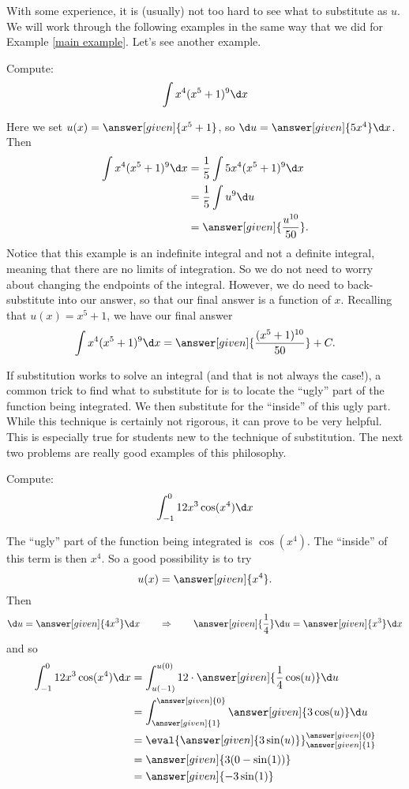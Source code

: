\documentclass{ximera}
\begin{document}
With some experience, it is (usually) not too hard to see what to
substitute as $u$.  We will work through the following examples in the
same way that we did for Example \ref{main example}. Let's see another
example.

\begin{example}
Compute:
\[
\int x^4(x^5+1)^{9} \d x
\]
\begin{explanation}
Here we set $u(x) =  \answer[given]{x^5+1}$, so $\d u =  \answer[given]{5x^4} \d x$.  Then
\begin{align*}
  \int x^4(x^5+1)^{9} \d x &= \frac{1}{5} \int 5x^4 (x^5+1)^{9} \d x \\
  &= \frac{1}{5} \int u^{9} \d u\\
&= \answer[given]{\frac{u^{10}}{50}}.
\end{align*}
Notice that this example is an indefinite integral and not a definite
integral, meaning that there are no limits of integration.  So we do
not need to worry about changing the endpoints of the integral.  However,
we do need to back-substitute into our answer, so that our final
answer is a function of $x$.  Recalling that $u(x) = x^5+1$, we have
our final answer
\[
\int x^4(x^5+1)^{9} \d x= \answer[given]{\frac{(x^5+1)^{10}}{50}}+C.
\]
\end{explanation}
\end{example}


If substitution works to solve an integral (and that is not always the
case!), a common trick to find what to substitute for is to locate the
``ugly'' part of the function being integrated.  We then substitute
for the ``inside'' of this ugly part.  While this technique is
certainly not rigorous, it can prove to be very helpful.  This is
especially true for students new to the technique of substitution.
The next two problems are really good examples of this philosophy.

\begin{example}
Compute:
\[
\int_{-1}^0 12x^3 \cos(x^4) \d x
\]
\begin{explanation}
The ``ugly'' part of the function being integrated is $\cos(x^4)$.  The
``inside'' of this term is then $x^4$.  So a good possibility is to
try
\[
u(x) =  \answer[given]{x^4}.
\]
Then
\[
\d u =  \answer[given]{4x^3} \d x 	\qquad	\Rightarrow	\qquad	\answer[given]{\frac{1}{4}} \d u = \answer[given]{x^3}\d x
\]
and so
\begin{align*}
\int_{-1}^0 12x^3 \cos(x^4) \d x &= \int_{u(-1)}^{u(0)} 12 \cdot\answer[given]{\frac{1}{4}\cos(u)} \d u  \\
&= \int_{\answer[given]{1}}^{\answer[given]{0}} \answer[given]{3 \cos(u)} \d u  \\
&= \eval{\answer[given]{3\sin(u)}}_{\answer[given]{1}}^{\answer[given]{0}}  \\
&= \answer[given]{3(0-\sin(1))}\\
&= \answer[given]{-3\sin(1)}
\end{align*}
\end{explanation}
\end{example}
\end{document}
